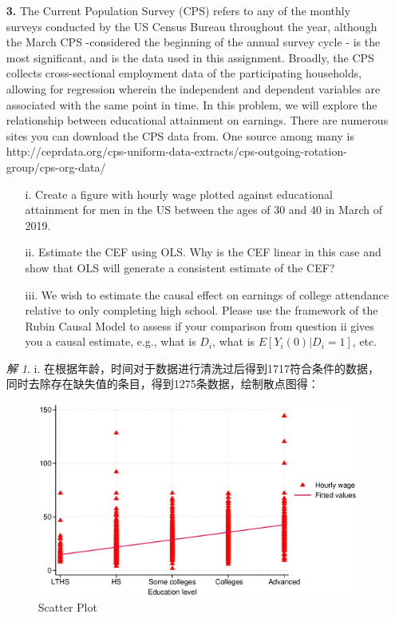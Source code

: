 \documentclass[a4paper]{ctexart}
\theoremstyle{remark}
\newtheorem*{solution}{解}
\begin{document}
\begin{itemize}
\item[\textbf{3.}] The Current Population Survey (CPS) refers to any of the monthly surveys conducted by the US Census Bureau throughout the year, although the March CPS -considered the beginning of the annual survey cycle - is the most significant, and is the data used in this assignment. Broadly, the CPS collects cross-sectional employment data of the participating households, allowing for regression wherein the independent and dependent variables are associated with the same point in time. In this problem, we will explore the relationship between educational attainment on earnings. There are numerous sites you can download the CPS data from. One source among many is http://ceprdata.org/cps-uniform-data-extracts/cps-outgoing-rotation-group/cps-org-data/
\begin{enumerate}
\item[i.] Create a figure with hourly wage plotted against educational attainment for men in the US between the ages of 30 and 40 in March of 2019.
\item[ii.]  Estimate the CEF using OLS. Why is the CEF linear in this case and show that OLS will generate a consistent estimate of the CEF?
\item[iii.]  We wish to estimate the causal effect on earnings of college attendance relative to only completing high school. Please use the framework of the Rubin Causal Model to assess if your comparison from question ii gives you a causal estimate, e.g., what is $D_i$, what is $E[Y_i(0)|D_i = 1]$, etc.
\end{enumerate}
\begin{solution}
    i.  在根据年龄，时间对于数据进行清洗过后得到1717符合条件的数据，同时去除存在缺失值的条目，得到1275条数据，绘制散点图得：%
    \begin{figure}[htbp] %
        \centering
        \includegraphics[scale=0.5]{Scatter plot in us 3.1.eps} %
        \caption{Scatter Plot}
    \end{figure}



\end{solution}
\end{itemize}
\end{document}
